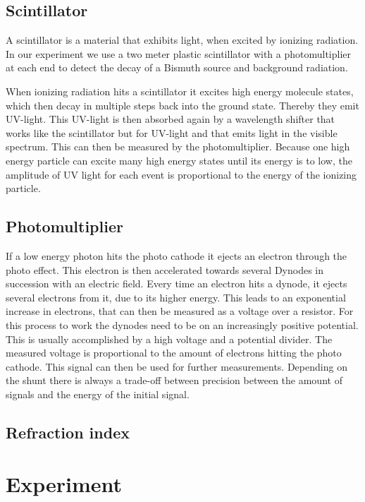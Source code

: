 \documentclass[]{article}
\begin{document}

\subsection{Scintillator}\label{scintillator}
A scintillator is a material that exhibits light, when excited by ionizing radiation. In our experiment we use a two meter plastic scintillator with a photomultiplier at each end to detect the decay of a Bismuth source and background radiation.

When ionizing radiation hits a scintillator it excites high energy molecule states, which then decay in multiple steps back into the ground state. Thereby they emit UV-light. This UV-light is then absorbed again by a wavelength shifter that works like the scintillator but for UV-light and that emits light in the visible spectrum. This can then be measured by the photomultiplier. Because one high energy particle can excite many high energy states until its energy is to low, the amplitude of UV light for each event is proportional to the energy of the ionizing particle.
\subsection{Photomultiplier}
If a low energy photon hits the photo cathode it ejects an electron through the photo effect. This electron is then accelerated towards several Dynodes in succession with an electric field. Every time an electron hits a dynode, it ejects several electrons from it, due to its higher energy. This leads to an exponential increase in electrons, that can then be measured as a voltage over a resistor. For this process to work the dynodes need to be on an increasingly positive potential. This is usually accomplished by a high voltage and a potential divider. 
The measured voltage is proportional to the amount of electrons hitting the photo cathode. This signal can then be used for further measurements. Depending on the shunt there is always a trade-off between precision between the amount of signals and the energy of the initial signal. 
\subsection{Refraction index}\label{refrac index}


\newpage
\section{Experiment}
\end{document}
